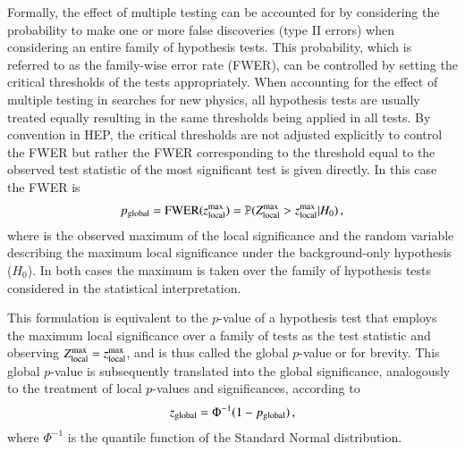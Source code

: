 Formally, the effect of multiple testing can be accounted for by
considering the probability to make one or more false discoveries
(type II errors) when considering an entire family of hypothesis
tests.
This probability, which is referred to as the family-wise error rate
(FWER), can be controlled by setting the critical thresholds of the
tests appropriately. When accounting for the effect of multiple
testing in searches for new physics, all hypothesis tests are usually
treated equally resulting in the same thresholds being applied in all
tests. By convention in HEP, the critical thresholds are not adjusted
explicitly to control the FWER but rather the FWER corresponding to
the threshold equal to the observed test statistic of the most
significant test is given directly. In this case the FWER is
\begin{align*}
  p_{\text{global}} = \text{FWER}(z_{\text{local}}^{\text{max}})
  = \mathbb{P}(Z_{\text{local}}^{\text{max}} > z_{\text{local}}^{\text{max}} \vert H_0)\,\text{,}
\end{align*}
where \zmaxlocal is the observed maximum of the local significance and
\Zmaxlocal the random variable describing the maximum local
significance under the background-only hypothesis ($H_0$). In both
cases the maximum is taken over the family of hypothesis tests
considered in the statistical interpretation.


This formulation %
is equivalent to the $p$-value of a hypothesis test that employs the
maximum local significance over a family of tests as the test
statistic and observing $Z_{\text{local}}^{\text{max}} = z_{\text{local}}^{\text{max}}$, and is thus called
the global $p$-value or \pglobal for brevity. This global $p$-value is
subsequently translated into the global significance, analogously to
the treatment of local $p$-values and significances, according to
\begin{align*}
  z_{\text{global}} = \Phi^{-1}(1 - p_{\text{global}}) \,\text{,}
\end{align*}
where $\Phi^{-1}$ is the quantile function of the Standard Normal
distribution.

